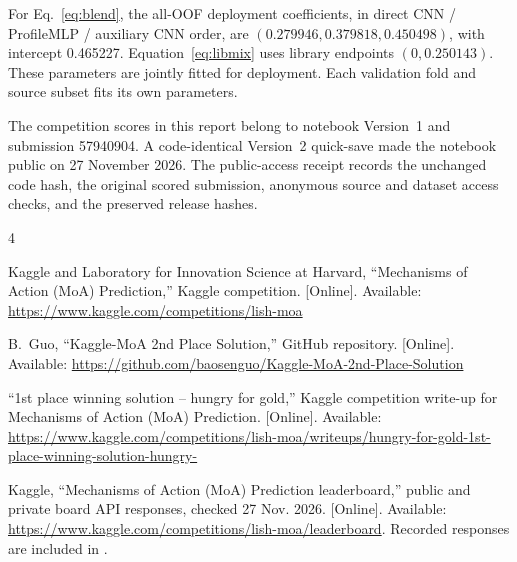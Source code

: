 \documentclass[journal]{IEEEtran}
\begin{document}
For Eq.~\eqref{eq:blend}, the all-OOF deployment coefficients, in direct CNN / ProfileMLP / auxiliary CNN order, are $(0.279946,0.379818,0.450498)$, with intercept 0.465227. Equation~\eqref{eq:libmix} uses library endpoints $(0,0.250143)$. These parameters are jointly fitted for deployment. Each validation fold and source subset fits its own parameters.

The competition scores in this report belong to notebook Version~1 and submission 57940904. A code-identical Version~2 quick-save made the notebook public on 27 November 2026. The public-access receipt records the unchanged code hash, the original scored submission, anonymous source and dataset access checks, and the preserved release hashes.

\begin{thebibliography}{4}


Kaggle and Laboratory for Innovation Science at Harvard, ``Mechanisms of Action (MoA) Prediction,'' Kaggle competition. [Online]. Available: \url{https://www.kaggle.com/competitions/lish-moa}

B.~Guo, ``Kaggle-MoA 2nd Place Solution,'' GitHub repository. [Online]. Available: \url{https://github.com/baosenguo/Kaggle-MoA-2nd-Place-Solution}

``1st place winning solution -- hungry for gold,'' Kaggle competition write-up for Mechanisms of Action (MoA) Prediction. [Online]. Available: \url{https://www.kaggle.com/competitions/lish-moa/writeups/hungry-for-gold-1st-place-winning-solution-hungry-}

Kaggle, ``Mechanisms of Action (MoA) Prediction leaderboard,'' public and private board API responses, checked 27 Nov. 2026. [Online]. Available: \url{https://www.kaggle.com/competitions/lish-moa/leaderboard}. Recorded responses are included in .

\end{thebibliography}
\end{document}
